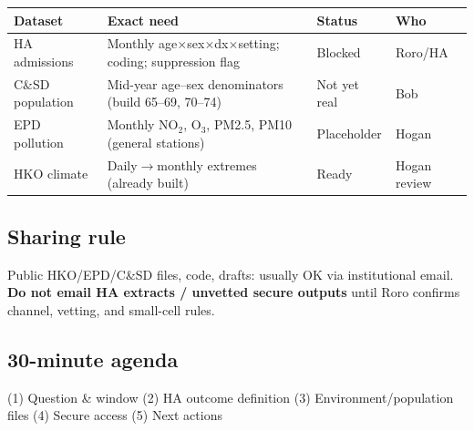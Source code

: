 \documentclass[10pt]{article}
\begin{document}
{\footnotesize
\begin{tabular}{@{}>{\raggedright\arraybackslash}p{2.5cm}>{\raggedright\arraybackslash}p{5.0cm}>{\raggedright\arraybackslash}p{1.8cm}>{\raggedright\arraybackslash}p{2.0cm}@{}}
\toprule
\textbf{Dataset} & \textbf{Exact need} & \textbf{Status} & \textbf{Who} \\
\midrule
HA admissions & Monthly age$\times$sex$\times$dx$\times$setting; coding; suppression flag & Blocked & Roro/HA \\
C\&SD population & Mid-year age--sex denominators (build 65--69, 70--74) & Not yet real & Bob \\
EPD pollution & Monthly NO$_2$, O$_3$, PM2.5, PM10 (general stations) & Placeholder & Hogan \\
HKO climate & Daily$\rightarrow$monthly extremes (already built) & Ready & Hogan review \\
\bottomrule
\end{tabular}
}

\vspace{0.4em}
\subsection*{Sharing rule}
Public HKO/EPD/C\&SD files, code, drafts: usually OK via institutional email.
\textbf{Do not email HA extracts / unvetted secure outputs} until Roro confirms channel, vetting, and small-cell rules.

\vspace{0.25em}
\subsection*{30-minute agenda}
(1) Question \& window \quad
(2) HA outcome definition \quad
(3) Environment/population files \quad
(4) Secure access \quad
(5) Next actions

\vspace{0.2em}
\end{document}
